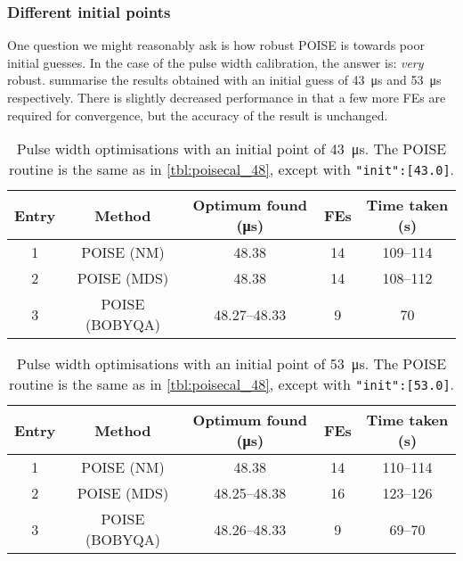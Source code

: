 \subsubsection{Different initial points}

One question we might reasonably ask is how robust POISE is towards poor initial guesses.
In the case of the pulse width calibration, the answer is: \textit{very} robust.
 summarise the results obtained with an initial guess of \SI{43}{\us} and \SI{53}{\us} respectively.
There is slightly decreased performance in that a few more FEs are required for convergence, but the accuracy of the result is unchanged.

\begin{table}[htb]
    \centering
    \begin{tabular}{ccccc}
        \toprule
        Entry & Method      & Optimum found (\si{\us}) & FEs & Time taken (\si{\s}) \\
        \midrule
        1 & POISE (NM)     & 48.38        & 14 & 109--114 \\
        2 & POISE (MDS)    & 48.38        & 14 & 108--112  \\
        3 & POISE (BOBYQA) & 48.27--48.33 & 9  & 70       \\
        \bottomrule
    \end{tabular}
    \caption[Pulse width calibrations using initial guess of \SI{43}{\us}]{
        Pulse width optimisations with an initial point of \SI{43}{\us}.
        The POISE routine is the same as in \cref{tbl:poisecal_48}, except with \texttt{"init":[43.0]}.
    }
    \label{tbl:poisecal_43}
\end{table}

\begin{table}[htb]
    \centering
    \begin{tabular}{ccccc}
        \toprule
        Entry & Method      & Optimum found (\si{\us}) & FEs & Time taken (\si{\s}) \\
        \midrule
        1 & POISE (NM)     & 48.38        & 14 & 110--114 \\
        2 & POISE (MDS)    & 48.25--48.38 & 16 & 123--126 \\
        3 & POISE (BOBYQA) & 48.26--48.33 & 9  & 69--70   \\
        \bottomrule
    \end{tabular}
    \caption[Pulse width calibrations using initial guess of \SI{53}{\us}]{
        Pulse width optimisations with an initial point of \SI{53}{\us}.
        The POISE routine is the same as in \cref{tbl:poisecal_48}, except with \texttt{"init":[53.0]}.
    }
    \label{tbl:poisecal_53}
\end{table}

